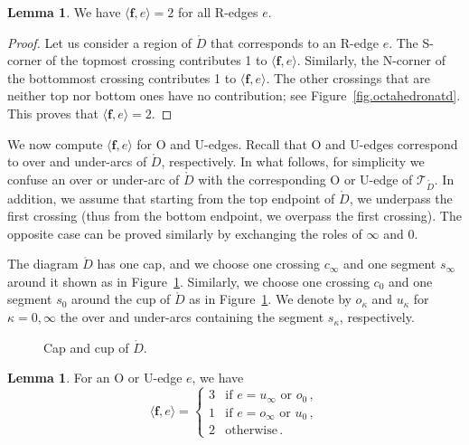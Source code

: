 \documentclass[12pt,reqno]{amsart}
\theoremstyle{definition}
\newtheorem{lemma}[theorem]{Lemma}
\def\calT{\mathcal T}
\renewcommand{\Ddot}{\mathring{D}}
\begin{document}
\begin{lemma} 
\label{lem.R}
We have $\langle {\boldsymbol f}, e \rangle=2$ for all R-edges $e$.
\end{lemma}

\begin{proof}
Let us consider a region of $\Ddot$ that corresponds to an R-edge $e$. The S-corner of
the topmost crossing contributes 1 to  $\langle {\boldsymbol f}, e \rangle$. Similarly,
the N-corner of the bottommost crossing contributes 1 to
$\langle {\boldsymbol f}, e \rangle$. The other crossings that are neither top nor
bottom ones have no contribution; see Figure~\ref{fig.octahedronatd}. This proves that
$\langle {\boldsymbol f}, e \rangle=2$. 
\end{proof}

We now compute $\langle \boldsymbol f  , e \rangle$ for O and U-edges. Recall that O
and U-edges correspond to over and under-arcs of $\Ddot$, respectively. In what follows,
for simplicity we confuse an over or under-arc of $\Ddot$ with the corresponding O or
U-edge of $\calT_{\Ddot}$. In addition, we assume that starting from the top endpoint of
$\Ddot$, we underpass the first crossing (thus from the bottom endpoint, we overpass the
first crossing). The opposite case can be proved similarly by exchanging the roles of
$\infty$ and  $0$. 

The diagram $\Ddot$ has one cap, and we choose one crossing $c_\infty$ and one segment
$s_\infty$ around it shown as in Figure~\ref{fig.infty}. Similarly, we choose one
crossing $c_0$ and one segment $s_0$ around the cup of $\Ddot$ as in
Figure~\ref{fig.infty}. We denote by $o_\kappa$ and $u_\kappa$ for $\kappa = 0,\infty$
the over and under-arcs containing the segment $s_\kappa$, respectively.

\begin{figure}[htpb!]

\caption{Cap and cup of $\Ddot$.}
\label{fig.infty}
\end{figure}

\begin{lemma} 
\label{lem.O}
For an O or U-edge $e$, we have
\begin{equation*}
\langle \boldsymbol f, e \rangle
=\begin{cases}
3 & \textrm{if } e =  u_\infty \textrm{ or } o_0 \,,\\
1 & \textrm{if } e = o_\infty \textrm{ or }  u_0 \,,\\	
2 & \textrm{otherwise} \,.
\end{cases}
\end{equation*}
\end{lemma}
\end{document}
